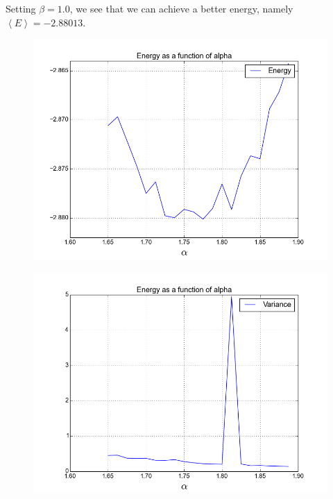 \documentclass[a4paper, 12pt, titlepage]{article}
\begin{document}
 Setting $\beta = 1.0$, we see that we can achieve a better energy, namely $\left<E\right> = -2.88013$. 
 \begin{figure}[H]
 	\centering
 	\includegraphics[width=\textwidth]{../python_programs/EnergyVariance_helium4.png}
 \end{figure}
 \begin{figure}[H]
 	\centering
 	\includegraphics[width=\textwidth]{../python_programs/EnergyVariance_helium5.png}
 \end{figure}
\end{document}
